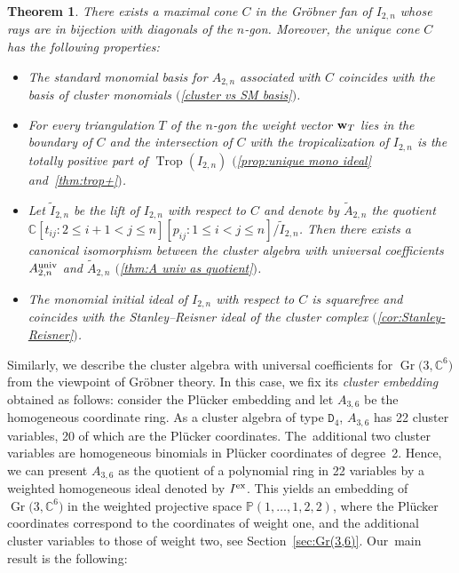 \documentclass[10pt,a4paper]{amsart}
\newcommand{\thref}[1]{\ref{#1}}
\newtheorem{Theorem}{Theorem}[section]
\numberwithin{equation}{section}
\DeclareMathOperator{\Gr}{Gr}
\DeclareMathOperator{\trop}{Trop}
\begin{document}
\begin{Theorem}
There exists a maximal cone $C$ in the Gr\"obner fan of $I_{2,n}$ whose rays are in bijection with diagonals of the $n$-gon. Moreover, the unique cone $C$ has the following properties:
\begin{itemize}\itemsep=0pt
 \item[$(i)$] The standard monomial basis for $A_{2,n}$ associated with $C$ coincides with the basis of cluster monomials $($\thref{cluster vs SM basis}$)$.
 \item[$(ii)$] For every triangulation $T$ of the $n$-gon the weight vector ${\bf w}_T$ lies in the boundary of $C$ and the intersection of $C$ with the tropicalization of $I_{2,n}$ is the totally positive part of $\trop(I_{2,n})$ $($\thref{prop:unique mono ideal} and~\thref{thm:trop+}$)$.
 \item[$(iii)$] Let $\tilde I_{2,n}$ be the lift of $I_{2,n}$ with respect to $C$ and denote by $\tilde A_{2,n}$ the quotient $\mathbb C[t_{ij}\colon 2\le i+1<j\le n][p_{ij}\colon 1\le i<j\le n]/\tilde I_{2,n}$.
 Then there exists a canonical isomorphism between the cluster algebra with universal coefficients $A_{2,n}^{\rm univ}$ and $\tilde A_{2,n}$ $($\thref{thm:A univ as quotient}$)$.
 \item[$(iv)$] The monomial initial ideal of $I_{2,n}$ with respect to $C$ is squarefree and coincides with the Stanley--Reisner ideal of the cluster complex $($\thref{cor:Stanley-Reisner}$)$.
\end{itemize}
\end{Theorem}

Similarly, we describe the cluster algebra with universal coefficients for $\Gr\big(3,\mathbb C^6\big)$ from the viewpoint of Gr\"obner theory.
In this case, we fix its {\it cluster embedding} obtained as follows: consider the Pl\"ucker embedding and let $A_{3,6}$ be the homogeneous coordinate ring.
As a cluster algebra of type $\mathtt D_4$, $A_{3,6}$ has 22 cluster variables, 20 of which are the Pl\"ucker coordinates.
The~addi\-tional two cluster variables are homogeneous binomials in Pl\"ucker coordinates of deg\-ree~2.
Hence, we can present $A_{3,6}$ as the quotient of a polynomial ring in 22 variables by a weighted homogeneous ideal denoted by $I^{\rm ex}$.
This yields an embedding of $\Gr\big(3,\mathbb C^6\big)$ in the weighted projective space $\mathbb P(1,\dots,1,2,2)$, where the Pl\"ucker coordinates correspond to the coordinates of weight one, and the additional cluster variables to those of weight two, see Section~\ref{sec:Gr(3,6)}.
Our~main result is the following:
\end{document}
